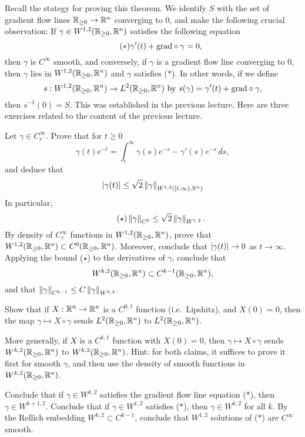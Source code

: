 Recall the stategy for proving this theorem. We identify $S$ with the set of gradient flow lines $\mathbb{R}_{\ge 0}\to \mathbb{R}^{n}$ converging to $0$, and make the following crucial observation: If $\gamma\in W^{1,2}(\mathbb{R}_{\ge 0},\mathbb{R}^{n})$ satisfies the following equation
\begin{equation*}\tag{$\ast$}
  \gamma'(t)+\mathrm{grad}\circ \gamma=0,
\end{equation*}
then $\gamma$ is $C^{\infty}$ smooth, and conversely, if $\gamma$ is a gradient flow line converging to $0$, then $\gamma$ lies in $W^{1,2}(\mathbb{R}_{\ge 0},\mathbb{R}^{n})$ and $\gamma$ satisfies ($\ast$). In other words, if we define
\begin{equation*}
  s:W^{1,2}(\mathbb{R}_{\ge 0},\mathbb{R}^{n})\to L^{2}(\mathbb{R}_{\ge 0},\mathbb{R}^{n}) \text{ by }s(\gamma)=\gamma'(t)+\mathrm{grad}\circ \gamma,
\end{equation*}
then $s^{-1}(0)=S$. This was established in the previous lecture. Here are three exercises related to the content of the previous lecture.
\begin{xca}
  Let $\gamma\in C^{\infty}_{c}$. Prove that for $t\ge 0$
  \begin{equation*}
    \gamma(t)e^{-t}=\int_{t}^{\infty}\gamma(s)e^{-s}-\gamma'(s)e^{-s}\,ds,
  \end{equation*}
  and deduce that
  \begin{equation*}
    \left|\gamma(t)\right|\le \sqrt{2}\left\lVert\gamma\right\rVert_{W^{1,2}([t,\infty),\mathbb{R}^{n})}
  \end{equation*}
  In particular, 
  \begin{equation*}\tag{$\star$}
    \left\lVert\gamma\right\rVert_{C^{0}}\le \sqrt{2}\left\lVert\gamma\right\rVert_{W^{1,2}}.
  \end{equation*}
  By density of $C^{\infty}_{c}$ functions in $W^{1,2}(\mathbb{R}_{\ge 0},\mathbb{R}^{n})$, prove that $W^{1,2}(\mathbb{R}_{\ge 0},\mathbb{R}^{n})\subset C^{0}(\mathbb{R}_{\ge 0},\mathbb{R}^{n})$. Moreover, conclude that $\left|\gamma(t)\right|\to 0$ as $t\to\infty$. Applying the bound ($\star$) to the derivatives of $\gamma$, conclude that $$W^{k,2}(\mathbb{R}_{\ge 0},\mathbb{R}^{n})\subset C^{k-1}(\mathbb{R}_{\ge 0},\mathbb{R}^{n}),$$
  and that $\left\lVert\gamma\right\rVert_{C^{k-1}}\le C\left\lVert\gamma\right\rVert_{W^{k,2}}$.
\end{xca}
\begin{xca}
  Show that if $X:\mathbb{R}^{n}\to \mathbb{R}^{n}$ is a $C^{0,1}$ function (i.e.\ Lipshitz), and $X(0)=0$, then the map $\gamma\mapsto X\circ \gamma$ sends $L^{2}(\mathbb{R}_{\ge 0},\mathbb{R}^{n})$ to $L^{2}(\mathbb{R}_{\ge 0},\mathbb{R}^{n})$. 
  
  More generally, if $X$ is a $C^{k,1}$ function with $X(0)=0$, then $\gamma\mapsto X\circ \gamma$ sends $W^{k,2}(\mathbb{R}_{\ge 0},\mathbb{R}^{n})$ to $W^{k,2}(\mathbb{R}_{\ge 0},\mathbb{R}^{n})$. Hint: for both claims, it suffices to prove it first for smooth $\gamma$, and then use the density of smooth functions in $W^{k,2}(\mathbb{R}_{\ge 0},\mathbb{R}^{n})$.  
\end{xca}
\begin{xca}
  Conclude that if $\gamma\in W^{k,2}$ satisfies the gradient flow line equation ($\ast$), then $\gamma\in W^{k+1,2}$. Conclude that if $\gamma\in W^{1,2}$ satisfies ($\ast$), then $\gamma\in W^{k,2}$ for all $k$. By the Rellich embedding $W^{k,2}\subset C^{k-1}$, conclude that $W^{1,2}$ solutions of ($\ast$) are $C^{\infty}$ smooth. 
\end{xca}


